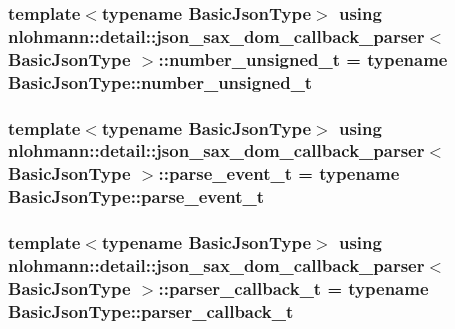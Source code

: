 \subsubsection[{\texorpdfstring{number\+\_\+unsigned\+\_\+t}{number_unsigned_t}}]{\setlength{\rightskip}{0pt plus 5cm}template$<$typename Basic\+Json\+Type$>$ using {\bf nlohmann\+::detail\+::json\+\_\+sax\+\_\+dom\+\_\+callback\+\_\+parser}$<$ Basic\+Json\+Type $>$\+::{\bf number\+\_\+unsigned\+\_\+t} =  typename Basic\+Json\+Type\+::number\+\_\+unsigned\+\_\+t}\hypertarget{classnlohmann_1_1detail_1_1json__sax__dom__callback__parser_a2406c5125f7128fb9c01921df2903001}{}\label{classnlohmann_1_1detail_1_1json__sax__dom__callback__parser_a2406c5125f7128fb9c01921df2903001}
\subsubsection[{\texorpdfstring{parse\+\_\+event\+\_\+t}{parse_event_t}}]{\setlength{\rightskip}{0pt plus 5cm}template$<$typename Basic\+Json\+Type$>$ using {\bf nlohmann\+::detail\+::json\+\_\+sax\+\_\+dom\+\_\+callback\+\_\+parser}$<$ Basic\+Json\+Type $>$\+::{\bf parse\+\_\+event\+\_\+t} =  typename Basic\+Json\+Type\+::parse\+\_\+event\+\_\+t}\hypertarget{classnlohmann_1_1detail_1_1json__sax__dom__callback__parser_aac6d706967b2ecc2510e172577d8550b}{}\label{classnlohmann_1_1detail_1_1json__sax__dom__callback__parser_aac6d706967b2ecc2510e172577d8550b}
\subsubsection[{\texorpdfstring{parser\+\_\+callback\+\_\+t}{parser_callback_t}}]{\setlength{\rightskip}{0pt plus 5cm}template$<$typename Basic\+Json\+Type$>$ using {\bf nlohmann\+::detail\+::json\+\_\+sax\+\_\+dom\+\_\+callback\+\_\+parser}$<$ Basic\+Json\+Type $>$\+::{\bf parser\+\_\+callback\+\_\+t} =  typename Basic\+Json\+Type\+::parser\+\_\+callback\+\_\+t}\hypertarget{classnlohmann_1_1detail_1_1json__sax__dom__callback__parser_a4f636086fa8e7cf26c35c8afd50903ce}{}\label{classnlohmann_1_1detail_1_1json__sax__dom__callback__parser_a4f636086fa8e7cf26c35c8afd50903ce}
